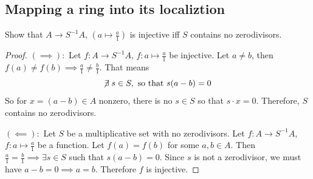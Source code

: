 \documentclass[hidelinks,12pt]{article}
\begin{document}
\subsection{Mapping a ring into its localiztion}Show that \(A\to S^{-1}A\), \((a\mapsto \frac{a}{1})\) is injective iff \(S\) contains no zerodivisors.
\begin{proof}
    \((\implies):\) Let \(f:A\to S^{-1}A\), \(f:a\mapsto \frac{a}{1}\) be injective. Let \(a\neq b\), then \(f(a)\neq f(b)\implies \frac{a}{1}\neq \frac{b}{1}\). That means \[
        \centernot\exists s\in S,\ \text{so that } s(a-b)=0
    \]
    So for \(x=(a-b)\in A\) nonzero, there is no \(s\in S\) so that \(s\cdot x=0\). Therefore, \(S\) contains no zerodivisors.
    \par\null\par \((\impliedby):\) Let \(S\) be a multiplicative set with no zerodivisors. Let \(f:A\to S^{-1}A\), \(f:a\mapsto \frac{a}{1}\) be a function. Let \(f(a)=f(b)\) for some \(a,b\in A\). Then \(\frac{a}{1}=\frac{b}{1}\implies\exists s\in S\) such that \(s(a-b)=0\). Since \(s\) is not a zerodivisor, we must have \(a-b=0\implies a=b\). Therefore \(f\) is injective.
\end{proof}
\end{document}
